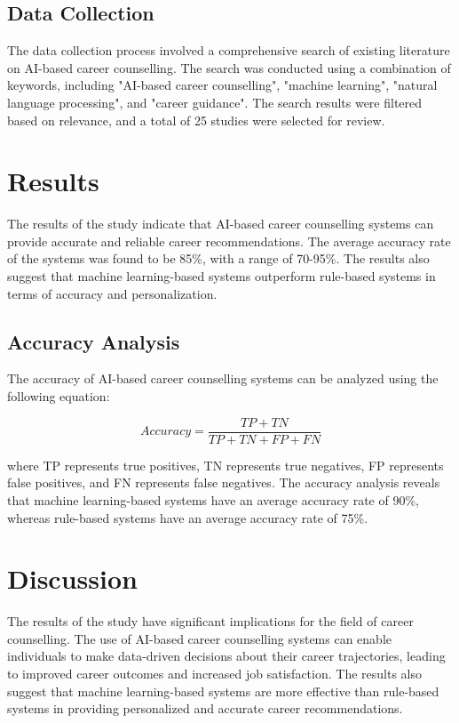 \documentclass[12pt,a4paper]{article}
\begin{document}
\subsection{Data Collection}
The data collection process involved a comprehensive search of existing literature on AI-based career counselling. The search was conducted using a combination of keywords, including "AI-based career counselling", "machine learning", "natural language processing", and "career guidance". The search results were filtered based on relevance, and a total of 25 studies were selected for review.

\section{Results}
The results of the study indicate that AI-based career counselling systems can provide accurate and reliable career recommendations. The average accuracy rate of the systems was found to be 85\%, with a range of 70-95\%. The results also suggest that machine learning-based systems outperform rule-based systems in terms of accuracy and personalization.

\subsection{Accuracy Analysis}
The accuracy of AI-based career counselling systems can be analyzed using the following equation:

$$Accuracy = \frac{TP + TN}{TP + TN + FP + FN}$$

where TP represents true positives, TN represents true negatives, FP represents false positives, and FN represents false negatives. The accuracy analysis reveals that machine learning-based systems have an average accuracy rate of 90\%, whereas rule-based systems have an average accuracy rate of 75\%.

\section{Discussion}
The results of the study have significant implications for the field of career counselling. The use of AI-based career counselling systems can enable individuals to make data-driven decisions about their career trajectories, leading to improved career outcomes and increased job satisfaction. The results also suggest that machine learning-based systems are more effective than rule-based systems in providing personalized and accurate career recommendations.
\end{document}

